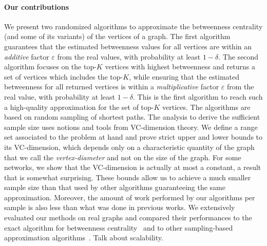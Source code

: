 \paragraph{Our contributions} 
We present two randomized algorithms to approximate the betweenness centrality
(and some of its variants) of the vertices of a graph. The first algorithm
guarantees that the estimated betweenness values for all vertices are within an
\emph{additive} factor $\varepsilon$ from the real values, with probability at
least $1-\delta$. The second algorithm focuses on the top-$K$ vertices with
highest betweenness and returns a set of vertices which includes the top-$K$,
while ensuring that the estimated betweenness for all returned vertices is
within a \emph{multiplicative} factor $\varepsilon$ from the real value, with
probability at least $1-\delta$. This is the first algorithm to reach such a
high-quality approximation for the set of top-$K$ vertices. The algorithms are
based on random sampling of shortest paths. The analysis to derive the
sufficient sample size uses notions and tools from VC-dimension theory. We
define a range set associated to the problem at hand and prove strict upper and
lower bounds to its VC-dimension, which depends only on a characteristic
quantity of the graph that we call the \emph{vertex-diameter} and not on the
size of the graph. For some networks, we show that the VC-dimension is actually
at most a constant, a result that is somewhat surprising. These bounds allow us
to achieve a much smaller sample size than that used by other algorithms
guaranteeing the same approximation. Moreover, the amount of work performed by
our algorithms per sample is also less than what was done in previous works. We
extensively evaluated our methods on real graphs and compared their performances
to the exact algorithm for betweenness centrality~\citep{Brandes01} and to other
sampling-based approximation algorithms~\citep{JacobKLPT05,BrandesP07}.
\XXX Talk about scalability.

